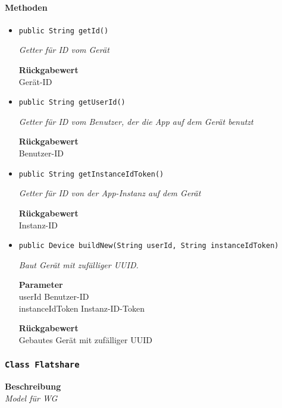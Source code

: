     \paragraph*{Methoden}
    \begin{itemize}
    	\item{\texttt{public String getId()}}
    	
    	\textit{Getter für ID vom Gerät}
    	
    	
    	
    	\textbf{Rückgabewert} \\
    	Gerät-ID        \item{\texttt{public String getUserId()}}
    	
    	\textit{Getter für ID vom Benutzer, der die App auf dem Gerät benutzt}
    	
    	
    	
    	\textbf{Rückgabewert} \\
    	Benutzer-ID        \item{\texttt{public String getInstanceIdToken()}}
    	
    	\textit{Getter für ID von der App-Instanz auf dem Gerät}
    	
    	
    	
    	\textbf{Rückgabewert} \\
    	Instanz-ID        \item{\texttt{public Device buildNew(String userId, String instanceIdToken)}}
    	
    	\textit{Baut Gerät mit zufälliger UUID.}
    	
    	\textbf{Parameter} \\
    	userId Benutzer-ID\\
    	instanceIdToken Instanz-ID-Token
    	
    	\textbf{Rückgabewert} \\
    	Gebautes Gerät mit zufälliger UUID
    \end{itemize}
    \subsubsection{\texttt{Class Flatshare}}
    \textbf{Beschreibung} \\
    \textit{Model für WG}
